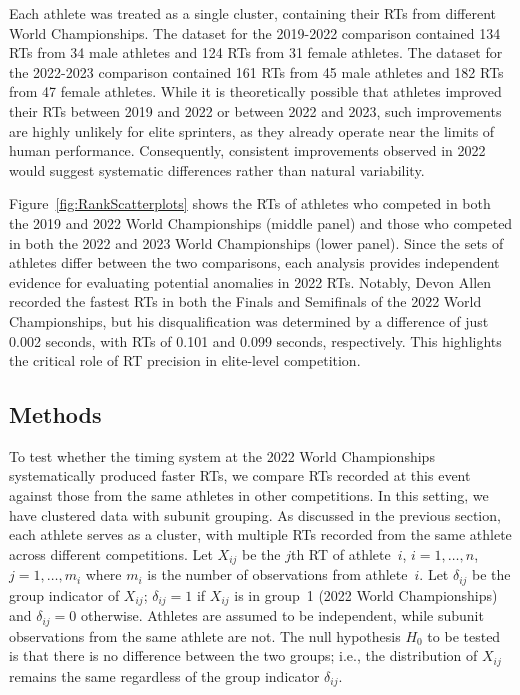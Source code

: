 \documentclass[12pt, letterpaper]{article}
\begin{document}
Each athlete was treated as a single cluster, containing their RTs
from different World Championships. The dataset for the 2019-2022
comparison contained 134 RTs from 34 male athletes and 124
RTs from 31 female athletes. The dataset for the 2022-2023
comparison contained 161 RTs from 45 male athletes and 182
RTs from 47 female athletes. While it is theoretically
possible that athletes improved their RTs between 2019 and
2022 or between 2022 and 2023, such improvements are highly unlikely for
elite sprinters, as they already operate near the limits of human
performance. Consequently, consistent improvements observed in 2022
would suggest systematic differences rather than natural variability.


Figure~\ref{fig:RankScatterplots} shows the RTs of athletes
who competed in both the 2019 and 2022 World Championships (middle
panel) and those who competed in both the 2022 and 2023 World
Championships (lower panel). Since the sets of athletes differ between 
the two comparisons, each analysis provides independent evidence 
for evaluating potential anomalies in 2022 RTs. Notably, Devon Allen
recorded the fastest RTs in both the Finals and Semifinals of the
2022 World Championships, but his disqualification was determined by a
difference of just 0.002 seconds, with RTs of 0.101 and
0.099 seconds, respectively. This highlights the critical role of
RT precision in elite-level competition.

\subsection{Methods}
\label{sec:methods_2022}

To test whether the timing system at the 2022 World Championships 
systematically produced faster RTs, we compare RTs recorded at this
event against those from the same athletes in other competitions. In
this setting, we have clustered data with subunit grouping. As discussed in the
previous section, each athlete serves as a cluster, with multiple RTs recorded 
from the same athlete across different competitions.
Let $X_{ij}$ be the $j$th RT of athlete~$i$, $i = 1, \ldots, n$,
$j = 1, \ldots, m_i$ where $m_i$ is the number of observations from
athlete~$i$. Let $\delta_{ij}$ be the group indicator of $X_{ij}$; $\delta_{ij}
= 1$ if $X_{ij}$ is in group~1 (2022 World Championships) and $\delta_{ij} = 0$
otherwise. Athletes are assumed to be independent, while subunit observations 
from the same athlete are not. The null hypothesis $H_0$ to be tested is that there is no difference
between the two groups; i.e., the distribution of $X_{ij}$ remains the same
regardless of the group indicator $\delta_{ij}$.
\end{document}

